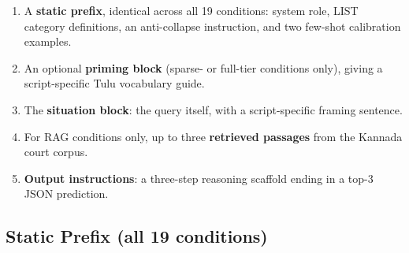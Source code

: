 \documentclass[11pt]{article}
\begin{document}
\begin{enumerate}
\item A \textbf{static prefix}, identical across all 19 conditions: system
      role, LIST category definitions, an anti-collapse instruction, and two
      few-shot calibration examples.
\item An optional \textbf{priming block} (sparse- or full-tier conditions
      only), giving a script-specific Tulu vocabulary guide.
\item The \textbf{situation block}: the query itself, with a script-specific
      framing sentence.
\item For RAG conditions only, up to three \textbf{retrieved passages} from
      the Kannada court corpus.
\item \textbf{Output instructions}: a three-step reasoning scaffold ending in
      a top-3 JSON prediction.
\end{enumerate}

\subsection{Static Prefix (all 19 conditions)}
\label{app:prompt-prefix}
\end{document}
